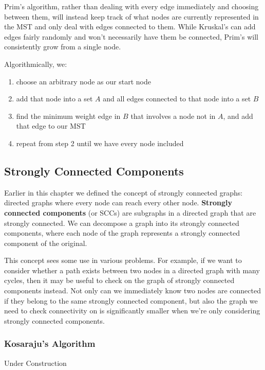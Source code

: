 Prim's algorithm, rather than dealing with every edge immediately and choosing between them, will instead keep track of what nodes are currently represented in the MST and only deal with edges connected to them. While Kruskal's can add edges fairly randomly and won't necessarily have them be connected, Prim's will consistently grow from a single node.

Algorithmically, we:
\begin{enumerate}
\item choose an arbitrary node as our start node
\item add that node into a set $A$ and all edges connected to that node into a set $B$
\item find the minimum weight edge in $B$ that involves a node not in $A$, and add that edge to our MST
\item repeat from step 2 until we have every node included
\end{enumerate}

\subsection{Strongly Connected Components}

Earlier in this chapter we defined the concept of strongly connected graphs: directed graphs where every node can reach every other node. \textbf{Strongly connected components} (or SCCs) are subgraphs in a directed graph that are strongly connected. We can decompose a graph into its strongly connected components, where each node of the graph represents a strongly connected component of the original.

This concept sees some use in various problems. For example, if we want to consider whether a path exists between two nodes in a directed graph with many cycles, then it may be useful to check on the graph of strongly connected components instead. Not only can we immediately know two nodes are connected if they belong to the same strongly connected component, but also the graph we need to check connectivity on is significantly smaller when we're only considering strongly connected components.

\subsubsection{Kosaraju's Algorithm}

Under Construction

